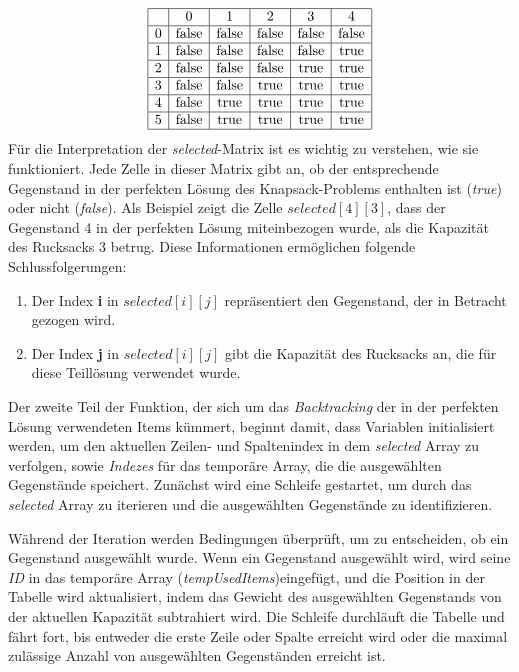 \[
\begin{array}{|c|c|c|c|c|c|}
\hline
& 0 & 1 & 2 & 3 & 4 \\
\hline
0 & \text{false} & \text{false} & \text{false} & \text{false} & \text{false} \\
\hline
1 & \text{false} & \text{false} & \text{false} & \text{false} & \text{true} \\
\hline
2 & \text{false} & \text{false} & \text{false} & \text{true} & \text{true} \\
\hline
3 & \text{false} & \text{false} & \text{true} & \text{true} & \text{true} \\
\hline
4 & \text{false} & \text{true} & \text{true} & \text{true} & \text{true} \\
\hline
5 & \text{false} & \text{true} & \text{true} & \text{true} & \text{true} \\
\hline
\end{array}
\]
Für die Interpretation der \textit{selected}-Matrix ist es wichtig zu verstehen, wie sie funktioniert. Jede Zelle in dieser
Matrix gibt an, ob der entsprechende Gegenstand in der perfekten Lösung des Knapsack-Problems enthalten ist (\textit{true})
oder nicht (\textit{false}). Als Beispiel zeigt die Zelle $selected[4][3]$, dass der Gegenstand 4 in der perfekten Lösung
miteinbezogen wurde, als die Kapazität des Rucksacks 3 betrug. Diese Informationen ermöglichen folgende Schlussfolgerungen:
\begin{enumerate}
\item Der Index \textbf{i} in $selected[i][j]$ repräsentiert den Gegenstand, der in Betracht gezogen wird.
\item Der Index \textbf{j} in $selected[i][j]$ gibt die Kapazität des Rucksacks an, die für diese Teillösung verwendet
wurde.
\end{enumerate}

Der zweite Teil der Funktion, der sich um das \textit{Backtracking} der in der perfekten Lösung verwendeten Items kümmert,
beginnt damit, dass Variablen initialisiert werden, um den aktuellen Zeilen- und Spaltenindex in dem \textit{selected}
Array zu verfolgen, sowie \textit{Indezes} für das temporäre Array, die die ausgewählten Gegenstände speichert. Zunächst
wird eine Schleife gestartet, um durch das \textit{selected} Array
zu iterieren und die ausgewählten Gegenstände zu identifizieren.

Während der Iteration werden Bedingungen überprüft, um zu entscheiden, ob ein Gegenstand ausgewählt wurde. Wenn ein
Gegenstand ausgewählt wird, wird seine \textit{ID} in das temporäre Array (\textit{tempUsedItems})eingefügt, und die
Position in der Tabelle wird aktualisiert, indem das Gewicht des ausgewählten Gegenstands von der aktuellen Kapazität
subtrahiert wird. Die Schleife durchläuft die Tabelle und fährt fort, bis entweder die erste Zeile oder Spalte erreicht
wird oder die maximal zulässige Anzahl von ausgewählten Gegenständen erreicht ist.

